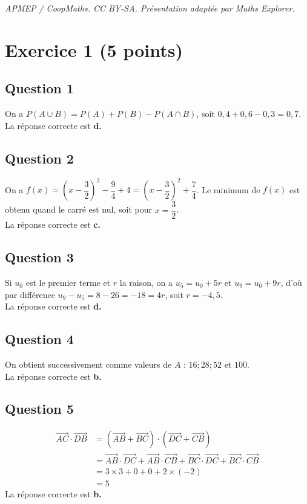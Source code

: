 \documentclass[10pt]{article}
\begin{document}
\noindent\textit{APMEP / CoopMaths. CC BY-SA. Présentation adaptée par Maths Explorer.}\par\medskip
\section*{Exercice 1 (5 points)}
	
	
\subsection*{Question 1}
On a $P(A \cup B) = P(A) + P(B) - P(A \cap B)$, soit $0,4 + 0,6 - 0,3 = 0,7$.\\ La réponse correcte est \textbf{d.}
	
\subsection*{Question 2}
On a $f(x) = \left(x - \dfrac{3}{2}\right)^2 - \dfrac{9}{4} + 4 = \left(x - \dfrac{3}{2}\right)^2 + \dfrac{7}{4}$. Le minimum de $f(x)$ est obtenu quand le carré est nul, soit pour $x = \dfrac{3}{2}$.\\ La réponse correcte est \textbf{c.}
	
\subsection*{Question 3}
Si $u_0$ est le premier terme et $r$ la raison, on a $u_5 = u_0 + 5r$ et $u_9 = u_0 + 9r$, d’où par différence $u_9 - u_5 = 8 - 26 = -18 = 4r$, soit $r = -4,5$. \\La réponse correcte est \textbf{d.}
	
\subsection*{Question 4}
On obtient successivement comme valeurs de $A$ : $16 ; 28 ; 52$ et $100$.\\
 La réponse correcte est \textbf{b.}
	
\subsection*{Question 5}
\begin{align*}
	\overrightarrow{AC} \cdot \overrightarrow{DB} &= \left(\overrightarrow{AB} + \overrightarrow{BC}\right) \cdot \left(\overrightarrow{DC} + \overrightarrow{CB}\right)\\
	& = \overrightarrow{AB} \cdot \overrightarrow{DC} + \overrightarrow{AB} \cdot \overrightarrow{CB} + \overrightarrow{BC} \cdot \overrightarrow{DC} + \overrightarrow{BC} \cdot \overrightarrow{CB}\\
	& = 3 \times 3 + 0 + 0 + 2 \times (-2)\\
	& = 5
\end{align*}
La réponse correcte est \textbf{b.}
\end{document}
